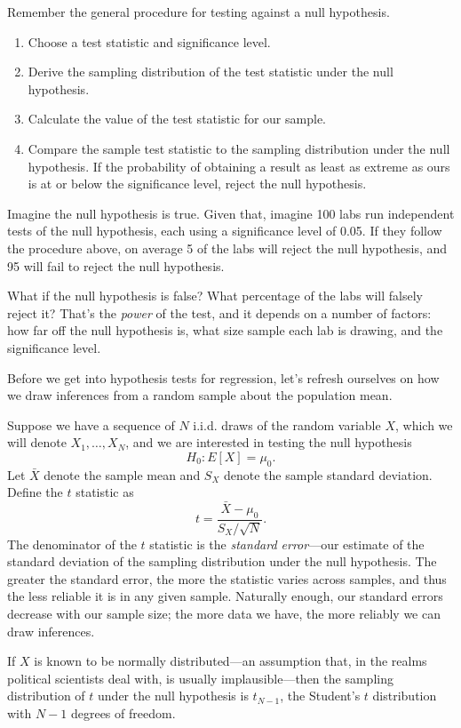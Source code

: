 \documentclass[
  12pt,
  oneside,openany]{book}
\begin{document}
Remember the general procedure for testing against a null hypothesis.

\begin{enumerate}
\def\labelenumi{\arabic{enumi}.}
\item
  Choose a test statistic and significance level.
\item
  Derive the sampling distribution of the test statistic under the null hypothesis.
\item
  Calculate the value of the test statistic for our sample.
\item
  Compare the sample test statistic to the sampling distribution under the null hypothesis. If the probability of obtaining a result as least as extreme as ours is at or below the significance level, reject the null hypothesis.
\end{enumerate}

Imagine the null hypothesis is true. Given that, imagine 100 labs run independent tests of the null hypothesis, each using a significance level of 0.05. If they follow the procedure above, on average 5 of the labs will reject the null hypothesis, and 95 will fail to reject the null hypothesis.

What if the null hypothesis is false? What percentage of the labs will falsely reject it? That's the \emph{power} of the test, and it depends on a number of factors: how far off the null hypothesis is, what size sample each lab is drawing, and the significance level.

Before we get into hypothesis tests for regression, let's refresh ourselves on how we draw inferences from a random sample about the population mean.

Suppose we have a sequence of \(N\) i.i.d. draws of the random variable \(X\), which we will denote \(X_1, \ldots, X_N\), and we are interested in testing the null hypothesis
\[
H_0 : E[X] = \mu_0.
\]
Let \(\bar{X}\) denote the sample mean and \(S_X\) denote the sample standard
deviation. Define the \(t\) statistic as
\[
t = \frac{\bar{X} - \mu_0}{S_X / \sqrt{N}}.
\]
The denominator of the \(t\) statistic is the \emph{standard error}---our estimate of the standard deviation of the sampling distribution under the null hypothesis. The greater the standard error, the more the statistic varies across samples, and thus the less reliable it is in any given sample. Naturally enough, our standard errors decrease with our sample size; the more data we have, the more reliably we can draw inferences.

If \(X\) is known to be normally distributed---an assumption that, in the realms political scientists deal with, is usually implausible---then the sampling distribution of \(t\) under the null hypothesis is \(t_{N - 1}\), the Student's \(t\) distribution with \(N - 1\) degrees of freedom.
\end{document}
